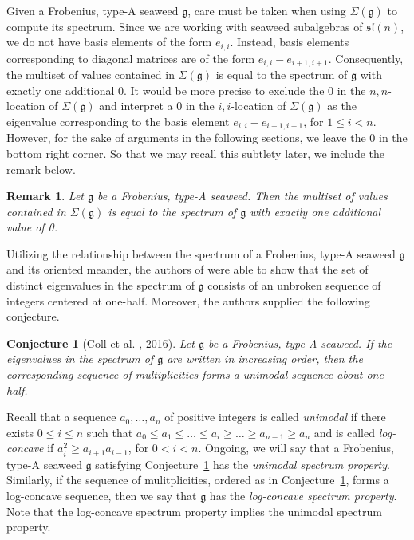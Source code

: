 \documentclass[letterpaper,10pt]{article}
\newtheorem{conj}[theorem]{Conjecture}
\newtheorem{remark}[theorem]{Remark}
\begin{document}
Given a Frobenius, type-A seaweed $\mathfrak{g}$, care must be taken when using $\Sigma(\mathfrak{g})$ to compute its spectrum. Since we are working with seaweed subalgebras of $\mathfrak{sl}(n)$, we do not have basis elements of the form $e_{i,i}$. Instead, basis elements corresponding to diagonal matrices are of the form $e_{i,i}-e_{i+1,i+1}$. Consequently, the multiset of values contained in $\Sigma(\mathfrak{g})$ is equal to the spectrum of $\mathfrak{g}$ with exactly one additional 0. It would be more precise to exclude the 0 in the $n,n$-location of $\Sigma(\mathfrak{g})$ and interpret a 0 in the $i,i$-location of $\Sigma(\mathfrak{g})$ as the eigenvalue corresponding to the basis element $e_{i,i}-e_{i+1,i+1}$, for $1\le i<n$. However, for the sake of arguments in the following sections, we leave the 0 in the bottom right corner. So that we may recall this subtlety later, we include the remark below.

\begin{remark}\label{rem:extra0}
Let $\mathfrak{g}$ be a Frobenius, type-A seaweed. Then the multiset of values contained in $\Sigma(\mathfrak{g})$ is equal to the spectrum of $\mathfrak{g}$ with exactly one additional value of 0.
\end{remark}

Utilizing the relationship between the spectrum of a Frobenius, type-A seaweed $\mathfrak{g}$ and its oriented meander, the authors of \textbf{\cite{unbroken}} were able to show that the set of distinct eigenvalues in the spectrum of $\mathfrak{g}$ consists of an unbroken sequence of integers centered at one-half. Moreover, the authors supplied the following conjecture.

\begin{conj}[Coll et al. \textbf{\cite{unbroken}}, 2016]\label{conj:uni}
Let $\mathfrak{g}$ be a Frobenius, type-A seaweed. If the eigenvalues in the spectrum of $\mathfrak{g}$ are written in increasing order, then the corresponding sequence of multiplicities forms a unimodal sequence about one-half.
\end{conj}

\noindent 
Recall that a sequence $a_0,\hdots,a_n$ of positive integers is called \textit{unimodal} if there exists $0\le i\le n$ such that $a_0\le a_1\le \hdots\le a_i\ge \hdots\ge a_{n-1}\ge a_n$ and is called \textit{log-concave} if $a_i^2\ge a_{i+1}a_{i-1}$, for $0<i<n$. Ongoing, we will say that a Frobenius, type-A seaweed $\mathfrak{g}$ satisfying Conjecture~\ref{conj:uni} has the \textit{unimodal spectrum property}. Similarly, if the sequence of mulitplicities, ordered as in Conjecture~\ref{conj:uni}, forms a log-concave sequence, then we say that $\mathfrak{g}$ has the \textit{log-concave spectrum property}. Note that the log-concave spectrum property implies the unimodal spectrum property.
\end{document}
